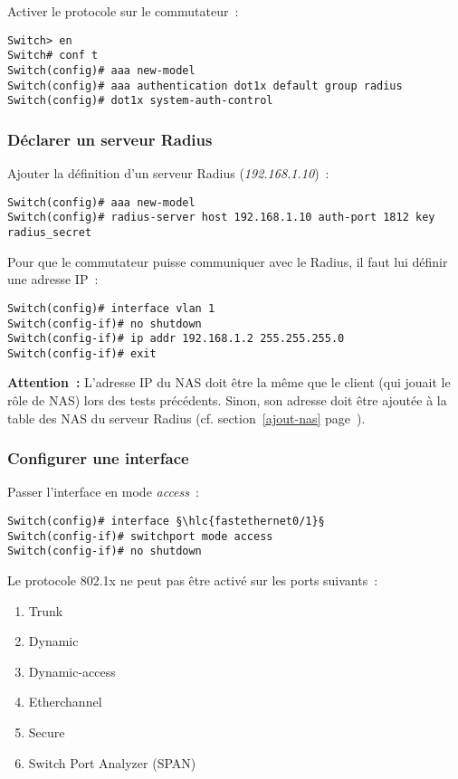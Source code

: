 Activer le protocole sur le commutateur~:

\begin{lstlisting}
Switch> en
Switch# conf t
Switch(config)# aaa new-model
Switch(config)# aaa authentication dot1x default group radius
Switch(config)# dot1x system-auth-control
\end{lstlisting}

\subsubsection{Déclarer un serveur Radius}

Ajouter la définition d'un serveur Radius (\emph{192.168.1.10})~:

\begin{lstlisting}
Switch(config)# aaa new-model
Switch(config)# radius-server host 192.168.1.10 auth-port 1812 key radius_secret
\end{lstlisting}

Pour que le commutateur puisse communiquer avec le Radius, il faut lui définir une adresse IP~:

\begin{lstlisting}
Switch(config)# interface vlan 1
Switch(config-if)# no shutdown
Switch(config-if)# ip addr 192.168.1.2 255.255.255.0
Switch(config-if)# exit
\end{lstlisting}

\textbf{{\huge\Stopsign} Attention~:} L'adresse IP du NAS doit être la même que le client (qui jouait le rôle de NAS) lors des tests précédents. Sinon, son adresse doit être ajoutée à la table des NAS du serveur Radius (cf. section~\ref{ajout-nas} page~\pageref{ajout-nas}).

\subsubsection{Configurer une interface}

Passer l'interface en mode \emph{access}~:

\begin{lstlisting}
Switch(config)# interface §\hlc{fastethernet0/1}§
Switch(config-if)# switchport mode access
Switch(config-if)# no shutdown
\end{lstlisting}

Le protocole 802.1x ne peut pas être activé sur les ports suivants~:

\begin{enumerate}
\item Trunk
\item Dynamic
\item Dynamic-access
\item Etherchannel
\item Secure
\item Switch Port Analyzer (SPAN)
\end{enumerate}

